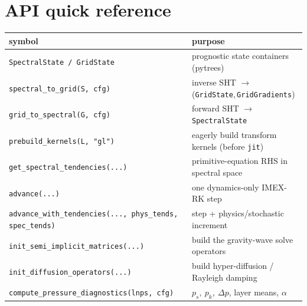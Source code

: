 \documentclass[11pt]{article}
\newcommand{\code}[1]{\texttt{#1}}
\begin{document}
\section*{API quick reference}
\begin{table}[h]
\centering
\begin{tabular}{lp{9.2cm}}
\toprule
symbol & purpose \\
\midrule
\code{SpectralState / GridState} & prognostic state containers (pytrees) \\
\code{spectral\_to\_grid(S, cfg)} & inverse SHT $\to$ (\code{GridState},\,\code{GridGradients}) \\
\code{grid\_to\_spectral(G, cfg)} & forward SHT $\to$ \code{SpectralState} \\
\code{prebuild\_kernels(L, "gl")} & eagerly build transform kernels (before \code{jit}) \\
\code{get\_spectral\_tendencies(...)} & primitive-equation RHS in spectral space \\
\code{advance(...)} & one dynamics-only IMEX-RK step \\
\code{advance\_with\_tendencies(..., phys\_tends, spec\_tends)} & step + physics/stochastic increment \\
\code{init\_semi\_implicit\_matrices(...)} & build the gravity-wave solve operators \\
\code{init\_diffusion\_operators(...)} & build hyper-diffusion / Rayleigh damping \\
\code{compute\_pressure\_diagnostics(lnps, cfg)} & $p_s,\ p_k,\ \Delta p$, layer means, $\alpha$ \\
\bottomrule
\end{tabular}
\end{table}

\end{document}
